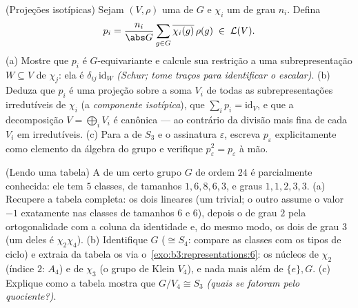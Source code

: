 \begin{exercise}[$\star\star$]\label{exo:b3:representations:11}
(Projeções isotípicas) Sejam $(V, \rho)$ uma  de $G$ e
$\chi_i$ um   de grau $n_i$. Defina
\[
p_i = \frac{n_i}{\abs G}\sum_{g\in G}
\overline{\chi_i(g)}\,\rho(g) \;\in\; \mathcal L(V).
\]
(a) Mostre que $p_i$ é $G$-equivariante e calcule sua restrição
a uma subrepresentação  $W \subseteq
V$ de  $\chi_j$: ela é
$\delta_{ij}\,
\mathrm{id}_W$ \emph{(Schur; tome traços para identificar o escalar)}.
(b) Deduza que $p_i$ é uma projeção sobre a soma $V_i$ de todas
as subrepresentações irredutíveis de  $\chi_i$ (a
\emph{componente isotípica}), que $\sum_ip_i =
\mathrm{id}_V$, e que a decomposição $V =
\bigoplus_iV_i$ é
canônica --- ao contrário da divisão mais fina de cada $V_i$ em
irredutíveis.
(c) Para a  de $S_3$ e o  assinatura
$\varepsilon$, escreva $p_\varepsilon$ explicitamente como elemento da álgebra do grupo e
verifique $p_\varepsilon^2
= p_\varepsilon$ à mão.
\end{exercise}

\begin{exercise}[$\star\star$]\label{exo:b3:representations:12}
(Lendo uma tabela) A  de um certo grupo $G$ de
ordem $24$ é parcialmente conhecida: ele tem $5$ classes, de
tamanhos $1, 6, 8, 6, 3$, e graus $1, 1, 2, 3, 3$.
(a) Recupere a tabela completa: os dois  lineares (um
trivial; o outro assume o valor $-1$ exatamente nas classes de
tamanhos $6$ e $6$), depois o  de grau $2$ pela
ortogonalidade com a coluna da identidade e, do mesmo modo, os dois
 de grau $3$ (um deles é $\chi_2\chi_4$).
(b) Identifique $G$ ($\cong S_4$: compare as classes com os tipos de
ciclo) e extraia da tabela os  via o~\cref{exo:b3:representations:6}:
os núcleos de $\chi_2$ (índice $2$: $A_4$) e de
$\chi_3$ (o grupo de Klein $V_4$), e nada mais além de $\{e\}, G$.
(c) Explique como a tabela mostra que $G/V_4 \cong S_3$ \emph{(quais  se
fatoram pelo quociente?)}.
\end{exercise}

